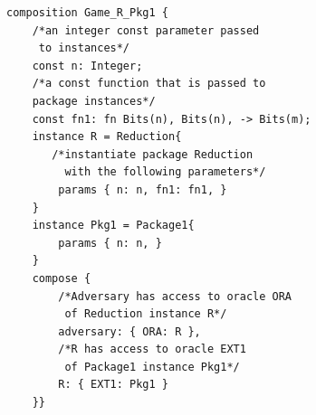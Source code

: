 \begin{longlisting}
\begin{verbatim}
composition Game_R_Pkg1 {
    /*an integer const parameter passed 
     to instances*/
    const n: Integer;
    /*a const function that is passed to 
    package instances*/
    const fn1: fn Bits(n), Bits(n), -> Bits(m);
    instance R = Reduction{
       /*instantiate package Reduction
         with the following parameters*/
        params { n: n, fn1: fn1, }
    }
    instance Pkg1 = Package1{
        params { n: n, }
    }
    compose {
        /*Adversary has access to oracle ORA 
         of Reduction instance R*/ 
        adversary: { ORA: R },
        /*R has access to oracle EXT1  
         of Package1 instance Pkg1*/
        R: { EXT1: Pkg1 }
    }}
\end{verbatim}
\caption{Example Domino composition}
\label{lst:domino-game-example}
\end{longlisting}